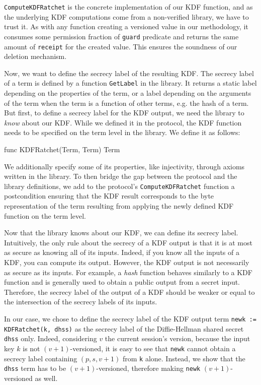 \texttt{ComputeKDFRatchet} is the concrete implementation of our KDF function, and as the underlying KDF computations come from a non-verified library, we have to trust it.
As with any function creating a versioned value in our methodology, it consumes some permission fraction of \texttt{guard} predicate and returns the same amount of \texttt{receipt} for the created value. This ensures the soundness of our deletion mechanism.

Now, we want to define the secrecy label of the resulting KDF.
The secrecy label of a term is defined by a function \texttt{GetLabel} in the library. It returns a static label depending on the properties of the term, or a label depending on the arguments of the term when the term is a function of other terms, e.g. the hash of a term.
But first, to define a secrecy label for the KDF output, we need the library to \emph{know} about our KDF. While we defined it in the protocol, the KDF function needs to be specified on the term level in the library. We define it as follows:
\begin{gobra}
func KDFRatchet(Term, Term) Term
\end{gobra}
We additionally specify some of its properties, like injectivity, through axioms written in the library.
To then bridge the gap between the protocol and the library definitions, we add to the protocol's \texttt{ComputeKDFRatchet} function a postcondition ensuring that the KDF result corresponds to the byte representation of the term resulting from applying the newly defined KDF function on the term level.

Now that the library knows about our KDF, we can define its secrecy label.
Intuitively, the only rule about the secrecy of a KDF output is that it is at most as secure as knowing all of its inputs. Indeed, if you know all the inputs of a KDF, you can compute its output.
However, the KDF output is not necessarily as secure as its inputs. For example, a \emph{hash} function behaves similarly to a KDF function and is generally used to obtain a public output from a secret input. 
Therefore, the secrecy label of the output of a KDF should be weaker or equal to the intersection of the secrecy labels of its inputs.

In our case, we chose to define the secrecy label of the KDF output term \texttt{newk~:= KDFRatchet(k, dhss)} as the secrecy label of the Diffie-Hellman shared secret \texttt{dhss} only.
Indeed, considering $v$ the current session's version, because the input key $k$ is not $(v+1)$-versioned, it is easy to see that \texttt{newk} cannot obtain a secrecy label containing $(p,s,v+1)$ from \texttt{k} alone.
Instead, we show that the \texttt{dhss} term has to be $(v+1)$-versioned, therefore making \texttt{newk} $(v+1)$-versioned as well.

